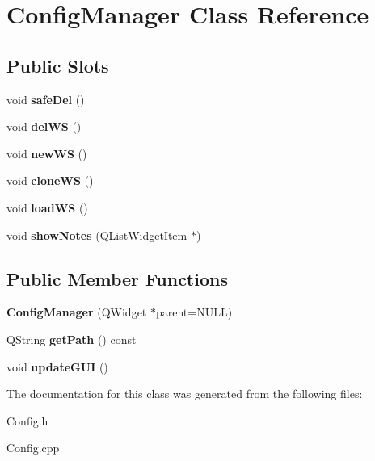 \hypertarget{classConfigManager}{\section{\-Config\-Manager \-Class \-Reference}
\label{classConfigManager}
}
\subsection*{\-Public \-Slots}
\begin{DoxyCompactItemize}
\item 
\hypertarget{classConfigManager_a721c4c7e71713002bcadf57b4883fae3}{void {\bfseries safe\-Del} ()}\label{classConfigManager_a721c4c7e71713002bcadf57b4883fae3}

\item 
\hypertarget{classConfigManager_a74c86eb13b1deda508a0483e41b026a9}{void {\bfseries del\-W\-S} ()}\label{classConfigManager_a74c86eb13b1deda508a0483e41b026a9}

\item 
\hypertarget{classConfigManager_a43b9c7671430720e150968e46a176aa4}{void {\bfseries new\-W\-S} ()}\label{classConfigManager_a43b9c7671430720e150968e46a176aa4}

\item 
\hypertarget{classConfigManager_a00d1376c8bc83c2d8962fcd425f9ab41}{void {\bfseries clone\-W\-S} ()}\label{classConfigManager_a00d1376c8bc83c2d8962fcd425f9ab41}

\item 
\hypertarget{classConfigManager_a2bebbaeb585436602c80979000e3b774}{void {\bfseries load\-W\-S} ()}\label{classConfigManager_a2bebbaeb585436602c80979000e3b774}

\item 
\hypertarget{classConfigManager_aeaa86a9dc608bc9b12cbc40348a07f27}{void {\bfseries show\-Notes} (\-Q\-List\-Widget\-Item $\ast$)}\label{classConfigManager_aeaa86a9dc608bc9b12cbc40348a07f27}

\end{DoxyCompactItemize}
\subsection*{\-Public \-Member \-Functions}
\begin{DoxyCompactItemize}
\item 
\hypertarget{classConfigManager_a58aa03db1b1215570423961a53aeea63}{{\bfseries \-Config\-Manager} (\-Q\-Widget $\ast$parent=\-N\-U\-L\-L)}\label{classConfigManager_a58aa03db1b1215570423961a53aeea63}

\item 
\hypertarget{classConfigManager_af1f8eeb720a79a591f2aa12de3abb458}{\-Q\-String {\bfseries get\-Path} () const }\label{classConfigManager_af1f8eeb720a79a591f2aa12de3abb458}

\item 
\hypertarget{classConfigManager_a49a873f13e89fbae0e0f74ea0a18f7ee}{void {\bfseries update\-G\-U\-I} ()}\label{classConfigManager_a49a873f13e89fbae0e0f74ea0a18f7ee}

\end{DoxyCompactItemize}


\-The documentation for this class was generated from the following files\-:\begin{DoxyCompactItemize}
\item 
\-Config.\-h\item 
\-Config.\-cpp\end{DoxyCompactItemize}
